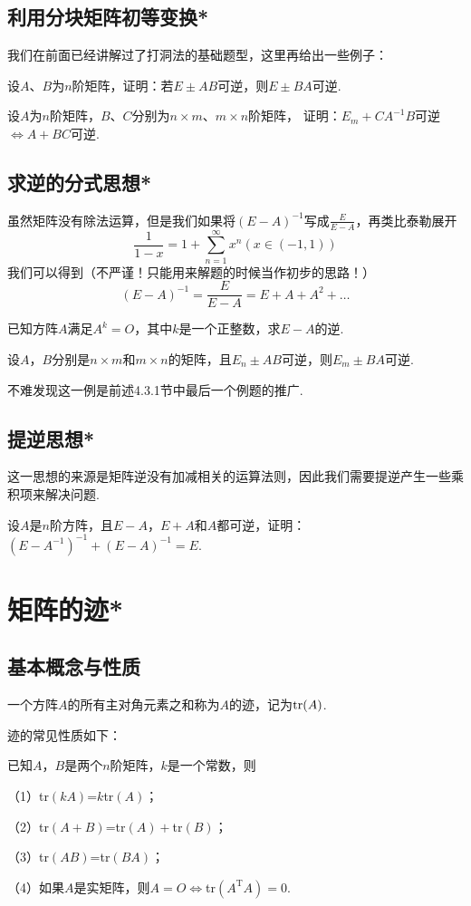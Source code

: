 \subsection{利用分块矩阵初等变换*}
我们在前面已经讲解过了打洞法的基础题型，这里再给出一些例子：
\begin{example}
	设$A$、$B$为$n$阶矩阵，证明：若$E\pm AB$可逆，则$E\pm BA$可逆.
\end{example}
\begin{example}
	设$A$为$n$阶矩阵，$B$、$C$分别为$n \times m$、$m \times n$阶矩阵，
	证明：$E_m+CA^{-1}B$可逆$\iff A+BC$可逆.
\end{example}

\subsection{求逆的分式思想*}
虽然矩阵没有除法运算，但是我们如果将$(E-A)^{-1}$写成$\frac{E}{E-A}$，再类比泰勒展开
$$\frac{1}{1-x}=1+\sum_{n=1}^\infty x^n(x\in (-1,1))$$我们可以得到（不严谨！只能用来解题的时候当作初步的思路！）
$$(E-A)^{-1}=\frac{E}{E-A}=E+A+A^2+\dots$$

\begin{example}
	已知方阵$A$满足$A^k=O$，其中$k$是一个正整数，求$E-A$的逆.
\end{example}

\begin{example}
	设$A$，$B$分别是$n \times m$和$m \times n$的矩阵，且$E_n \pm AB$可逆，则$E_m \pm BA$可逆.
\end{example}
不难发现这一例是前述4.3.1节中最后一个例题的推广.

\subsection{提逆思想*}
这一思想的来源是矩阵逆没有加减相关的运算法则，因此我们需要提逆产生一些乘积项来解决问题.
\begin{example}
	设$A$是$n$阶方阵，且$E-A$，$E+A$和$A$都可逆，证明：$(E-A^{-1})^{-1}+(E-A)^{-1}=E$.
\end{example}

\section{矩阵的迹*}
\subsection{基本概念与性质}
\begin{definition}
	一个方阵$A$的所有主对角元素之和称为$A$的迹，记为$\textup{tr}(A)$.
\end{definition}
迹的常见性质如下：
\begin{theorem}
	已知$A$，$B$是两个$n$阶矩阵，$k$是一个常数，则

	\textup{（1）}\textup{tr}$(kA)$=$k$\textup{tr}$(A)$；

	\textup{（2）}\textup{tr}$(A+B)$=\textup{tr}$(A)+$\textup{tr}$(B)$；
	
	\textup{（3）}\textup{tr}$(AB)$=\textup{tr}$(BA)$；
	
	\textup{（4）}如果$A$是实矩阵，则$A=O \iff$\textup{tr}$(A^{\mathrm{T}}A)=0$.
\end{theorem}

